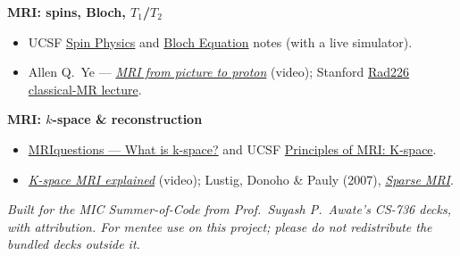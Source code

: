 \documentclass[11pt]{article}
\begin{document}
\textbf{MRI: spins, Bloch, $T_1$/$T_2$}
\begin{itemize}[nosep,leftmargin=*]
  \item UCSF \href{https://larsonlab.github.io/MRI-education-resources/Spin\%20Physics.html}{Spin Physics} and \href{https://larsonlab.github.io/MRI-education-resources/Bloch\%20Equation.html}{Bloch Equation} notes (with a live simulator).
  \item Allen Q.\ Ye --- \href{https://www.youtube.com/watch?v=djAxjtN_7VE}{\emph{MRI from picture to proton}} (video); Stanford \href{https://web.stanford.edu/class/rad226a/Lectures/Lecture2-2017-Classical-MR.pdf}{Rad226 classical-MR lecture}.
\end{itemize}

\textbf{MRI: $k$-space \& reconstruction}
\begin{itemize}[nosep,leftmargin=*]
  \item \href{https://mriquestions.com/what-is-k-space.html}{MRIquestions --- What is k-space?} and UCSF \href{https://larsonlab.github.io/MRI-education-resources/K-space.html}{Principles of MRI: K-space}.
  \item \href{https://www.youtube.com/watch?v=hlTWxwYNmwY}{\emph{K-space MRI explained}} (video); Lustig, Donoho \& Pauly (2007), \href{https://onlinelibrary.wiley.com/doi/10.1002/mrm.21391}{\emph{Sparse MRI}}.
\end{itemize}

\vfill
\begin{center}\small\itshape
Built for the MIC Summer-of-Code from Prof.\ Suyash P.\ Awate's CS-736 decks,
with attribution. For mentee use on this project; please do not redistribute the
bundled decks outside it.
\end{center}
\end{document}
